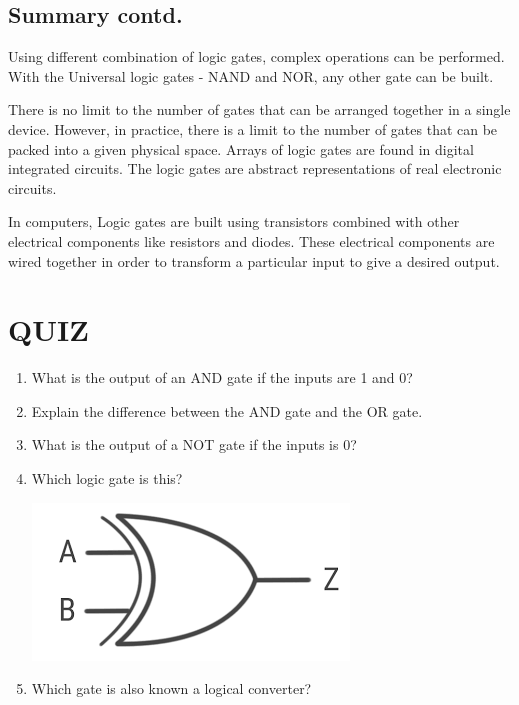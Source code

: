 \documentclass{article}
\begin{document}
\subsection{Summary contd.}
Using different combination of logic gates, complex operations can be performed. 
With the Universal logic gates - NAND and NOR, any other gate can be built.

There is no limit to the number of gates that can be arranged together in a single device.  
However, in practice, there is a limit to the number of gates that can be packed into a given physical space. 
Arrays of logic gates are found in digital integrated circuits.
The logic gates are abstract representations of real electronic circuits. \cite{okoacha2021sum}

In computers, Logic gates are built using transistors combined with other electrical components like resistors and diodes. 
These electrical components are wired together in order to transform a particular input to give a desired output.
\newpage
\section{QUIZ}
\begin{enumerate}
\item	What is the output of an AND gate if the inputs are 1 and 0?
	
\item	Explain the difference between the AND gate and the OR gate.
	
\item	What is the output of a NOT gate if the inputs is 0?
	
\item	Which logic gate is this?
\begin{center}
	\includegraphics[width=0.6\linewidth]{xor2}
\end{center}
	
\item	Which gate is also known a logical converter?
	
\end{enumerate}
\newpage


\end{document}
